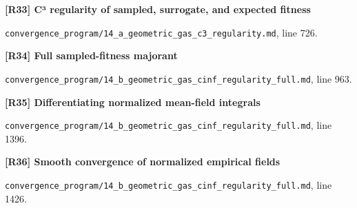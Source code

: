 \documentclass[11pt,a4paper]{article}
\begin{document}
\par\medskip\noindent\begin{minipage}{\linewidth}\textbf{[R33] C³ regularity of sampled, surrogate, and expected fitness}\label{src:thm-c3-regularity}\par
{\small\texttt{}\par
\nolinkurl{convergence_program/14_a_geometric_gas_c3_regularity.md}, line 726.\par}
\end{minipage}\par

\par\medskip\noindent\begin{minipage}{\linewidth}\textbf{[R34] Full sampled-fitness majorant}\label{src:thm-main-cinf-regularity-fitness-potential-full}\par
{\small\texttt{}\par
\nolinkurl{convergence_program/14_b_geometric_gas_cinf_regularity_full.md}, line 963.\par}
\end{minipage}\par

\par\medskip\noindent\begin{minipage}{\linewidth}\textbf{[R35] Differentiating normalized mean-field integrals}\label{src:thm-cinf-mean-field-integrals}\par
{\small\texttt{}\par
\nolinkurl{convergence_program/14_b_geometric_gas_cinf_regularity_full.md}, line 1396.\par}
\end{minipage}\par

\par\medskip\noindent\begin{minipage}{\linewidth}\textbf{[R36] Smooth convergence of normalized empirical fields}\label{src:thm-cinf-empirical-field-convergence}\par
{\small\texttt{}\par
\nolinkurl{convergence_program/14_b_geometric_gas_cinf_regularity_full.md}, line 1426.\par}
\end{minipage}\par
\end{document}
